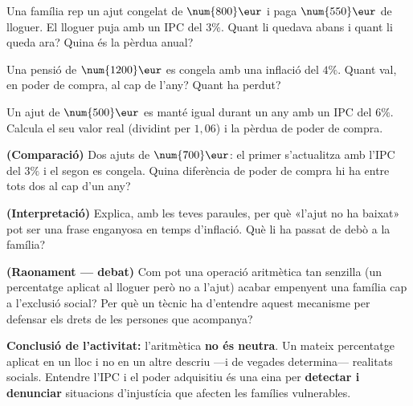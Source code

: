 \begin{exercicis}
\begin{exlist}
  \item Una família rep un ajut congelat de $\num{800}\eur$ i paga $\num{550}\eur$ de
        lloguer. El lloguer puja amb un IPC del $3\%$. Quant li quedava abans i quant li
        queda ara? Quina és la pèrdua anual?
  \item Una pensió de $\num{1200}\eur$ es congela amb una inflació del $4\%$. Quant val,
        en poder de compra, al cap de l'any? Quant ha perdut?
  \item Un ajut de $\num{500}\eur$ es manté igual durant un any amb un IPC del $6\%$.
        Calcula el seu valor real (dividint per $1,06$) i la pèrdua de poder de compra.
  \item \textbf{(Comparació)} Dos ajuts de $\num{700}\eur$: el primer s'actualitza amb
        l'IPC del $3\%$ i el segon es congela. Quina diferència de poder de compra hi ha
        entre tots dos al cap d'un any?
  \item \textbf{(Interpretació)} Explica, amb les teves paraules, per què «l'ajut no ha
        baixat» pot ser una frase enganyosa en temps d'inflació. Què li ha passat de
        debò a la família?
  \item \textbf{(Raonament — debat)} Com pot una operació aritmètica tan senzilla (un
        percentatge aplicat al lloguer però no a l'ajut) acabar empenyent una família
        cap a l'exclusió social? Per què un tècnic ha d'entendre aquest mecanisme per
        defensar els drets de les persones que acompanya?
\end{exlist}
\end{exercicis}

\begin{idea}
\textbf{Conclusió de l'activitat:} l'aritmètica \textbf{no és neutra}. Un mateix
percentatge aplicat en un lloc i no en un altre descriu —i de vegades determina—
realitats socials. Entendre l'IPC i el poder adquisitiu és una eina per
\textbf{detectar i denunciar} situacions d'injustícia que afecten les famílies
vulnerables.
\end{idea}

